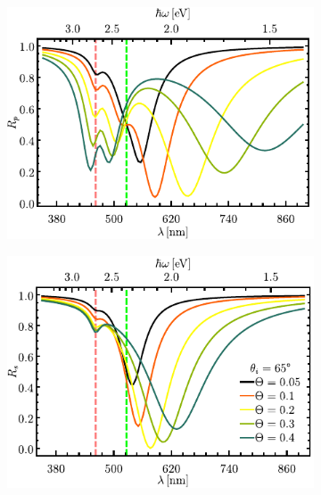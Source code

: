 \begin{figure}[h!]\centering\hspace*{-1.5em}
	\begin{subfigure}{.01\linewidth}\caption{}\label{sfig:R-ATR4-cutp}\vspace{4.5cm}\end{subfigure}
	\begin{subfigure}{.45\linewidth}\hspace*{-1.5em}
	\includegraphics[scale=1]{2-Resultados/figs/1-Wp4ThetaVar/cut_angle_65_p.pdf}\end{subfigure}
	\begin{subfigure}{.01\linewidth}\caption{}\label{sfig:R-ATR4-cuts}\vspace{4.5cm}\end{subfigure}\hspace*{-1.em}
	\begin{subfigure}{.45\linewidth}\centering
	\includegraphics[scale=1 ]{2-Resultados/figs/1-Wp4ThetaVar/cut_angle_65_s.pdf}\end{subfigure}\vspace*{-.5em}

\end{figure}
